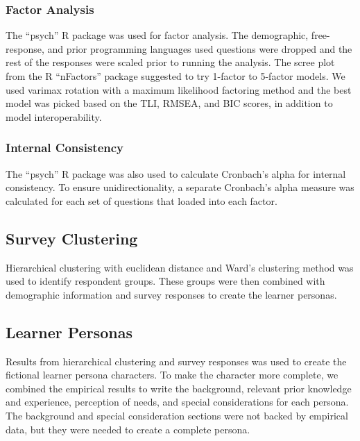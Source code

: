 \documentclass[../main.tex]{subfiles}
\begin{document}
        \subsubsection{Factor Analysis}

            The ``psych'' R package was used for factor analysis.
            The demographic, free-response, and prior programming languages used questions
            were dropped and the rest of the responses were scaled prior to running the analysis.
            The scree plot from the R ``nFactors'' package suggested to try 1-factor to 5-factor models.
            We used varimax rotation with a maximum likelihood factoring method and
            the best model was picked based on the
            TLI, RMSEA, and BIC scores, in addition to model interoperability.

        \subsubsection{Internal Consistency}

            The ``psych'' R package was also used to calculate Cronbach's alpha for internal consistency.
            To ensure unidirectionality,
            a separate Cronbach's alpha measure was calculated for each set of questions that loaded into each factor.

    \subsection{Survey Clustering}

        Hierarchical clustering with euclidean distance and Ward's clustering method was used to identify respondent groups. %
        These groups were then combined with demographic information and survey responses to create the learner personas.

    \subsection{Learner Personas}

        Results from hierarchical clustering and survey responses was used to create the
        fictional learner persona characters.
        To make the character more complete,
        we combined the empirical results to write the
        background,
        relevant prior knowledge and experience,
        perception of needs,
        and special considerations
        for each persona.
        The background and special consideration sections were not backed by empirical data,
        but they were needed to create a complete persona.
\end{document}
